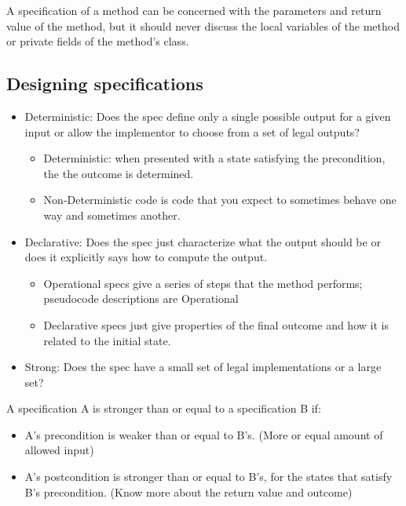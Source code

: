\documentclass[letterpaper,12pt]{article}
\begin{document}
A specification of a method can be concerned with the parameters and return
value of the method, but it should never discuss the local variables of the method
or private fields of the method's class.

\subsection{Designing specifications}
\begin{itemize}
      \item Deterministic: Does the spec define only a single possible output for a given
            input or allow the implementor to choose from a set of legal outputs?
            \begin{itemize}
                  \item Deterministic: when presented with a state satisfying the precondition, the
                        the outcome is determined.
                  \item Non-Deterministic code is code that you expect to sometimes behave one way and
                        sometimes another.
            \end{itemize}
      \item Declarative: Does the spec just characterize what the output should be or does
            it explicitly says how to compute the output.
            \begin{itemize}
                  \item Operational specs give a series of steps that the method performs; pseudocode
                        descriptions are Operational
                  \item Declarative specs just give properties of the final outcome and how it is
                        related to the initial state.
            \end{itemize}
      \item Strong: Does the spec have a small set of legal implementations or a large set?
\end{itemize}

A specification A is stronger than or equal to a specification B if:
\begin{itemize}
      \item A's precondition is weaker than or equal to B's. (More or equal amount of
            allowed input)
      \item A's postcondition is stronger than or equal to B's, for the states that satisfy
            B's precondition. (Know more about the return value and outcome)
\end{itemize}
\end{document}
